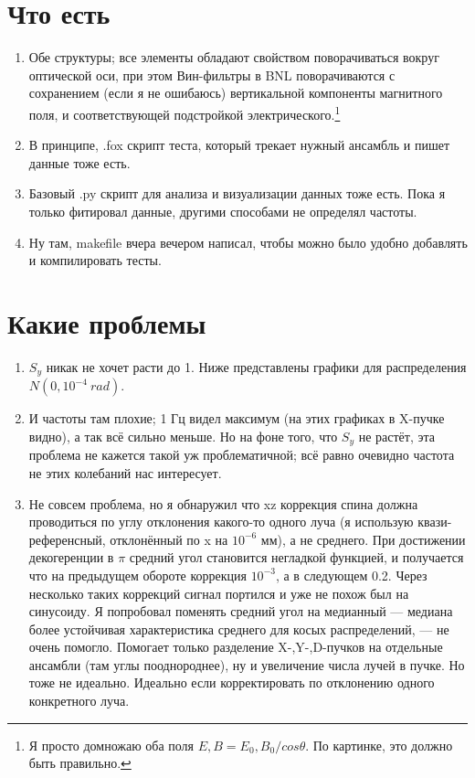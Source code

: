 \documentclass{article}
\begin{document}
\section{Что есть}
\begin{enumerate}
\item Обе структуры; все элементы обладают свойством поворачиваться вокруг оптической оси, при этом Вин-фильтры в BNL поворачиваются с сохранением (если я не ошибаюсь) вертикальной компоненты магнитного поля, и соответствующей подстройкой электрического.\footnote{Я просто домножаю оба поля $E,B = E_0,B_0/cos\theta$. По картинке, это должно быть правильно.}
\item В принципе, .fox скрипт теста, который трекает нужный ансамбль и пишет данные тоже есть.
\item Базовый .py скрипт для анализа и визуализации данных тоже есть. Пока я только фитировал данные, другими способами не определял частоты.
  \item Ну там, makefile вчера вечером написал, чтобы можно было удобно добавлять и компилировать тесты.
\end{enumerate}

\section{Какие проблемы}
\begin{enumerate}
\item $S_y$ никак не хочет расти до 1. Ниже представлены графики для распределения $N(0, 10^{-4}~ rad)$.
\item И частоты там плохие; 1 Гц видел максимум (на этих графиках в X-пучке видно), а так всё сильно меньше. Но на фоне того, что $S_y$ не растёт, эта проблема не кажется такой уж проблематичной; всё равно очевидно частота не этих колебаний нас интересует.
  \item Не совсем проблема, но я обнаружил что xz коррекция спина должна проводиться по углу отклонения какого-то одного луча (я использую квази-референсный, отклонённый по x на $10^{-6}$ мм), а не среднего. При достижении декогеренции в $\pi$ средний угол становится негладкой функцией, и получается что на предыдущем обороте коррекция $10^{-3}$, а в следующем 0.2. Через несколько таких коррекций сигнал портился и уже не похож был на синусоиду. Я попробовал поменять средний угол на медианный --- медиана более устойчивая характеристика среднего для косых распределений, --- не очень помогло. Помогает только разделение X-,Y-,D-пучков на отдельные ансамбли (там углы пооднороднее), ну и увеличение числа лучей в пучке. Но тоже не идеально. Идеально если корректировать по отклонению одного конкретного луча.
\end{enumerate}
\end{document}
